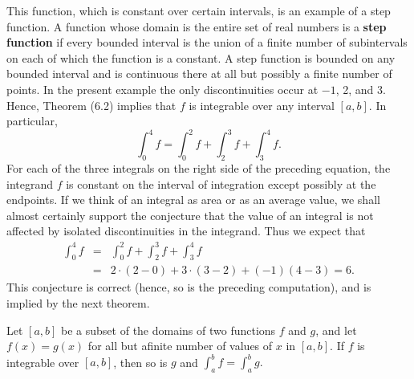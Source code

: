 This function, which is constant over certain intervals, is an example of a step function. A function whose domain is the entire set of real numbers is a \textbf{step function} if every bounded interval is the union of a finite number of subintervals on each of which the function is a constant. A step function is bounded on any bounded interval and is continuous there at all but possibly a finite number of points. In the present example the only discontinuities occur at $-1$, 2, and 3. Hence, Theorem (6.2) implies that $f$ is integrable over any interval $[a, b]$. In particular,
$$
\int_0^4 f = \int_0^2 f + \int_2^3 f + \int_3^4 f.
$$
\noindent For each of the three integrals on the right side of the preceding equation, the integrand $f$ is constant on the interval of integration except possibly at the endpoints. If we think of an integral as area or as an average value, we shall almost certainly support the conjecture that the value of an integral is not affected by isolated discontinuities in the integrand. Thus we expect that
\begin{eqnarray*}
\int_0^4 f &=& \int_0^2 f + \int_2^3 f + \int_3^4 f\\
               &=& 2 \cdot (2 - 0) + 3 \cdot (3 - 2) + (- 1)(4 - 3) = 6.
\end{eqnarray*}
\noindent This conjecture is correct (hence, so is the preceding computation), and is implied by the next theorem.

\begin{theorem} %
Let $[a, b]$ be a subset of the domains of two functions $f$ and $g$, and let $f (x) = g(x)$ for all but afinite number of values of $x$ in $[a, b]$. If $f$ is integrable over $[a, b]$, then so is $g$ and $\int_a^b f = \int_a^b g.$
\end{theorem}

